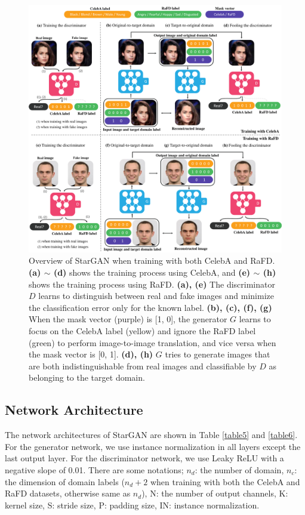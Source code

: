 \documentclass[10pt,twocolumn,letterpaper]{article}
\begin{document}
\begin{figure}[h]
\centering
\centerline{\includegraphics[width=0.95\linewidth]{images/supple_model_final.pdf}}
\medskip
\caption{Overview of StarGAN when training with both CelebA and RaFD. \textbf{(a) $\sim$ (d)} shows the training process using CelebA, and \textbf{(e) $\sim$ (h)} shows the training process using RaFD. \textbf{(a), (e)} The discriminator $D$ learns to distinguish between real and fake images and minimize the classification error only for the known label. \textbf{(b), (c), (f), (g)} When the mask vector (purple) is [1, 0], the generator $G$ learns to focus on the CelebA label (yellow) and ignore the RaFD label (green) to perform image-to-image translation, and vice versa when the mask vector is [0, 1]. \textbf{(d), (h)} $G$ tries to generate images that are both indistinguishable from real images and classifiable by $D$ as belonging to the target domain.}
\label{figure8}
\end{figure}


\medskip

\subsection{Network Architecture} \label{section7_2}
The network architectures of StarGAN are shown in Table \ref{table5} and \ref{table6}.  For the generator network, we use instance normalization in all layers except the last output layer. For the discriminator network, we use Leaky ReLU with a negative slope of 0.01. There are some notations; ${n}_{d}$: the number of domain, ${n}_{c}$: the dimension of domain labels (${n}_{d}+2$ when training with both the CelebA and RaFD datasets, otherwise same as ${n}_{d}$), N: the number of output channels, K: kernel size, S: stride size, P: padding size, IN: instance normalization.
\end{document}
